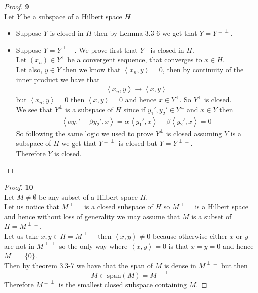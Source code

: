 \documentclass[11pt]{article}
\newcommand{\inprd}[1]{\left\langle{#1}\right\rangle}
\theoremstyle{definition}
\begin{document}
\cleardoublepage
\begin{proof}{\textbf{9}}\\
Let $Y$ be a subspace of a Hilbert space $H$
\begin{itemize}
\item [$(\Rightarrow)$] Suppose $Y$ is closed in $H$ then by Lemma 3.3-6 we get
that $Y = Y^{\perp\perp}$.
\item [$(\Leftarrow)$] Suppose $Y = Y^{\perp\perp}$. We prove first that
$Y^\perp$ is closed in $H$.
\\
Let $(x_n) \in Y^\perp$ be a convergent sequence, that converges to $x \in H$.
\\
Let also, $y \in Y$ then we know that $\inprd{x_n, y} = 0$, then by continuity
of the inner product we have that
\begin{align*}
    \inprd{x_n,y} \to \inprd{x,y}
\end{align*}
but $\inprd{x_n,y} = 0$ then $\inprd{x,y} = 0$ and hence $x \in Y^\perp$.
So $Y^\perp$ is closed.
\\
We see that $Y^\perp$ is a subspace of $H$ since if $y_1', y_2' \in Y^\perp$
and $x \in Y$ then
\begin{align*}
    \inprd{\alpha y_1' + \beta y_2', x} =
    \alpha\inprd{y_1', x} + \beta\inprd{y_2', x} = 0
\end{align*}
So following the same logic we used to prove $Y^\perp$ is closed
assuming $Y$ is a subspace of $H$ we get that $Y^{\perp\perp}$ is closed 
but $Y = Y^{\perp\perp}$.
\\
Therefore $Y$ is closed.
\end{itemize}
\end{proof}

\cleardoublepage
\begin{proof}{\textbf{10}}\\
Let $M \neq \emptyset$ be any subset of a Hilbert space $H$.
\\
Let us notice that $M^{\perp\perp}$ is a closed subspace of $H$ so
$M^{\perp\perp}$ is a Hilbert space and hence without loss of generality we 
may assume that $M$ is a subset of $H= M^{\perp\perp}$.
\\
Let us take $x, y \in H = M^{\perp\perp}$ then $\inprd{x,y} \neq 0$ because
otherwise either $x$ or $y$ are not in $M^{\perp\perp}$ so the only way where
$\inprd{x,y} = 0$ is that $x = y = 0$ and hence $M^\perp = \{0\}$.
\\
Then by theorem 3.3-7 we have that the span of $M$ is dense in $M^{\perp\perp}$
but then
$$M \subset \overline{\text{span}(M)} = M^{\perp\perp}$$
Therefore $M^{\perp\perp}$ is the smallest closed subspace containing $M$.
\end{proof}
\end{document}
